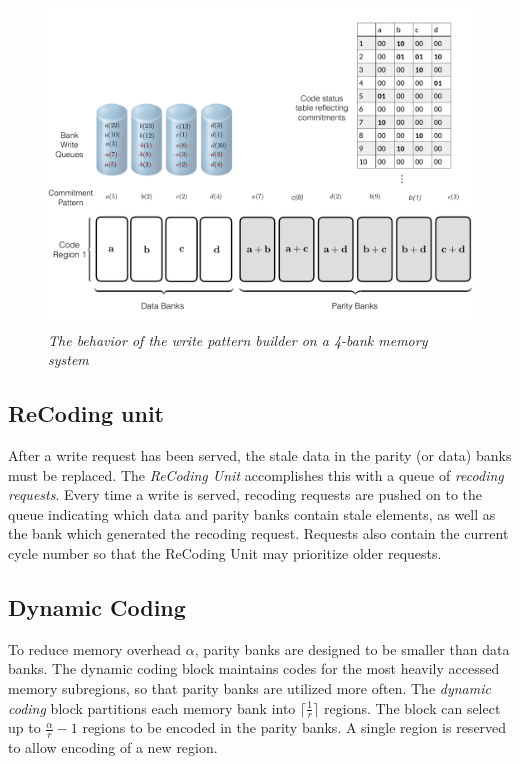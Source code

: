 \begin{figure}[t!]
\centering
         \includegraphics[width=\linewidth]{fig/Write-Algo-Example.png}
	\caption{\it{The behavior of the write pattern builder on a 4-bank memory system}}
	\label{fig:writeAlgoAccessPattern}
\end{figure}
\subsection{ReCoding unit}
\label{sec:recoding}
After a write request has been served, the stale data in the parity (or data) banks must be replaced. The \textit{ReCoding Unit} accomplishes this with a queue of {\em recoding requests}. Every time a write is served, recoding requests are pushed on to the queue indicating which data and parity banks contain stale elements, as well as the bank which generated the recoding request. Requests also contain the current cycle number so that the ReCoding Unit may prioritize older requests.

\subsection{Dynamic Coding}
\label{sec:dynamicCoding}
To reduce memory overhead $\alpha$, parity banks are designed to be smaller than data banks. The dynamic coding block maintains codes for the most heavily accessed memory subregions, so that parity banks are utilized more often.
%
%
The {\em dynamic coding} block partitions each memory bank into $\lceil\frac{1}{r}\rceil$ regions. The block can select up to $\frac{\alpha}{r} - 1$ regions to be encoded in the parity banks. A single region is reserved to allow encoding of a new region.

